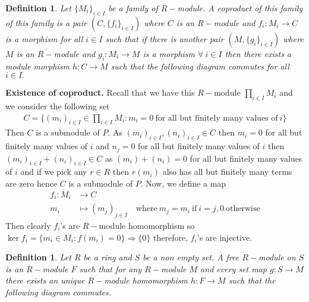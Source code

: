 \documentclass[11pt]{amsart}
\newtheorem{defn}[theorem]{Definition}
\begin{document}
\begin{defn}
Let $\{M_i\}_{i\in I}$ be a family of $R-$module. A coproduct of this family of this family is a pair $(C,\{f_i\}_{i\in I})$ where $C$ is an $R-$module and $f_i:M_i\to C$ is a morphism for all $i\in I$ such that if there is another pair $(M,\{g_i\}_{i\in I})$ where $M$ is an $R-$module and $g_i:M_i\to M$ is a morphism $\forall~i\in I$ then there exists a module morphism $h:C\to M$ such that the following diagram commutes for all $i\in I.$
\begin{center}
\end{center}
\end{defn}

\textbf{Existence of coproduct.} Recall that we have this $R-$module $\displaystyle\prod_{i\in I} M_i$ and we consider the following set \begin{align*}
C=\{(m_i)_{i\in I}\in \displaystyle\prod_{i\in I} M_i: m_i=0~\text{for all but finitely many values of}~i\} 
\end{align*}
Then $C$ is a submodule of $P$. As $(m_i)_{i\in I},(n_i)_{i\in I}\in C$ then $m_i=0$ for all but finitely many values of $i$ and $n_j=0$ for all but finitely many values of $i$ then $(m_i)_{i\in I}+(n_i)_{i\in I}\in C$ as $(m_i)+(n_i)=0$ for all but finitely many values of $i$ and if we pick any $r\in R$ then $r(m_i)$ also has all but finitely many terms are zero hence $C$ is a submodule of $P$. Now, we define a map \begin{align*}
f_i:M_i&\to C\\
m_i&\mapsto (m_j)_{j\in I}\quad\text{where}~m_j=m_i~\text{if}~i=j, 0~\text{otherwise}
\end{align*}
Then clearly $f_i$'s are $R-$module homomorphism so $\ker f_i=\{m_i\in M_i:f(m_i)=0\}\Rightarrow \{0\}$ therefore, $f_i$'s are injective. 


\begin{defn}
Let $R$ be a ring and $S$ be a non empty set. A free $R-$module on $S$ is an $R-$module $F$ such that for any $R-$module $M$ and every set map $g:S\to M$ there exists an unique $R-$module homomorphism $h:F\to M$ such that the following diagram commutes.
\begin{center}
\end{center}
\end{defn}
\end{document}
